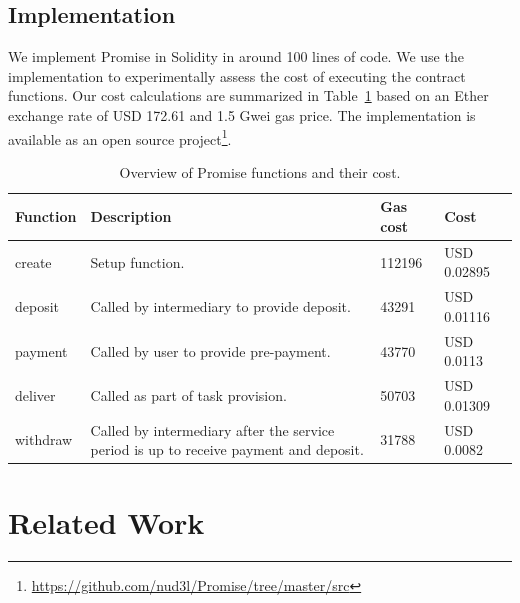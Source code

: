 \documentclass[runningheads]{llncs}
\newcommand{\sys}{Promise\xspace}
\begin{document}


\subsection{Implementation}

We implement \sys in Solidity in around 100 lines of code.
We use the implementation to experimentally assess the cost of executing the contract functions.
Our cost calculations are summarized in Table~\ref{tab:implementation} based on an Ether exchange rate of USD 172.61 and 1.5 Gwei gas price.
The implementation is available as an open source project\footnote{\url{https://github.com/nud3l/Promise/tree/master/src}}.

\begin{table}[h]
\centering
\caption{Overview of \sys functions and their cost.}
\label{tab:implementation}
\begin{tabularx}{\textwidth}{lXll}
\toprule 
\textbf{Function} & \textbf{Description} & \textbf{Gas cost} & \textbf{Cost} \\ \toprule
create & Setup function. & 112196 & USD 0.02895 \\ 
deposit & Called by intermediary to provide deposit. & 43291 & USD 0.01116 \\
payment & Called by user to provide pre-payment. & 43770 & USD 0.0113 \\ \midrule
deliver & Called as part of task provision. & 50703 & USD 0.01309 \\ \midrule
withdraw & Called by intermediary after the service period is up to receive payment and deposit. & 31788 & USD 0.0082 \\
\bottomrule
\end{tabularx}
\end{table}




\section{Related Work}
\label{sec:related}
\end{document}
